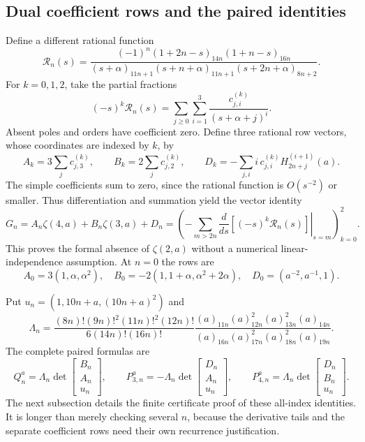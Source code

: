 \subsection{Dual coefficient rows and the paired identities}
Define a different rational function
\begin{equation}\label{eq:paired-R}
 \mathcal R_n(s)=
 \frac{(-1)^n(1+2n-s)_{14n}(1+n-s)_{16n}}
 {(s+\alpha)_{11n+1}(s+n+\alpha)_{11n+1}(s+2n+\alpha)_{8n+2}}.
\end{equation}
For $k=0,1,2$, take the partial fractions
\[
 (-s)^k\mathcal R_n(s)=
       \sum_{j\geq0}\sum_{i=1}^3\frac{c_{j,i}^{(k)}}{(s+\alpha+j)^i}.
\]
Absent poles and orders have coefficient zero. Define three rational
row vectors, whose coordinates are indexed by $k$, by
\begin{equation}\label{eq:paired-rows}
 A_k=3\sum_jc_{j,3}^{(k)},\qquad
 B_k=2\sum_jc_{j,2}^{(k)},\qquad
 D_k=-\sum_{j,i}i\,c_{j,i}^{(k)}H_{2n+j}^{(i+1)}(a).
\end{equation}
The simple coefficients sum to zero, since the rational function is
$O(s^{-2})$ or smaller. Thus differentiation and summation yield the
vector identity
\begin{equation}\label{eq:paired-state}
 G_n=A_n\zeta(4,a)+B_n\zeta(3,a)+D_n
 =\left(-\sum_{m>2n}\left.\frac{d}{ds}
                  [(-s)^k\mathcal R_n(s)]\right|_{s=m}\right)_{k=0}^2.
\end{equation}
This proves the formal absence of $\zeta(2,a)$ without a numerical
linear-independence assumption. At $n=0$ the rows are
\[
 A_0=3(1,\alpha,\alpha^2),\quad
 B_0=-2(1,1+\alpha,\alpha^2+2\alpha),\quad
 D_0=(a^{-2},a^{-1},1).
\]

Put $u_n=(1,10n+a,(10n+a)^2)$ and
\begin{equation}\label{eq:paired-lambda}
 \Lambda_n=
 \frac{(8n)!(9n)!^2(11n)!^2(12n)!}{6(14n)!(16n)!}
 \frac{(a)_{11n}(a)_{12n}^2(a)_{13n}^2(a)_{14n}}
 {(a)_{16n}(a)_{17n}^2(a)_{18n}^2(a)_{19n}}.
\end{equation}
The complete paired formulas are
\begin{equation}\label{eq:paired-minors}
 Q_n^a=\Lambda_n\det\begin{bmatrix}B_n\\A_n\\u_n\end{bmatrix},\qquad
 P_{3,n}^a=-\Lambda_n\det\begin{bmatrix}D_n\\A_n\\u_n\end{bmatrix},\qquad
 P_{4,n}^a=\Lambda_n\det\begin{bmatrix}D_n\\B_n\\u_n\end{bmatrix}.
\end{equation}
The next subsection details the finite certificate proof of these
all-index identities. It is longer than merely checking several $n$,
because the derivative tails and the separate coefficient rows need
their own recurrence justification.

